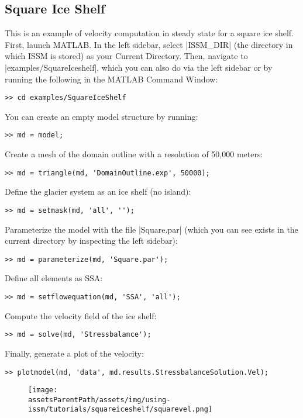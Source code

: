 
\subsection{Square Ice Shelf} \label{sec:using-issm-tutorials-squareiceshelf}
This is an example of velocity computation in steady state for a square ice shelf. First, launch MATLAB. In the left sidebar, select \lstinlinebg|ISSM_DIR| (the directory in which ISSM is stored) as your Current Directory. Then, navigate to \lstinlinebg|examples/SquareIceshelf|, which you can also do via the left sidebar or by running the following in the MATLAB Command Window:
\begin{lstlisting}
>> cd examples/SquareIceShelf
\end{lstlisting}

You can create an empty model structure by running:
\begin{lstlisting}
>> md = model;
\end{lstlisting}

Create a mesh of the domain outline with a resolution of 50,000 meters:
\begin{lstlisting}
>> md = triangle(md, 'DomainOutline.exp', 50000);
\end{lstlisting}

Define the glacier system as an ice shelf (no island):
\begin{lstlisting}
>> md = setmask(md, 'all', '');
\end{lstlisting}

Parameterize the model with the file \lstinlinebg|Square.par| (which you can see exists in the current directory by inspecting the left sidebar):
\begin{lstlisting}
>> md = parameterize(md, 'Square.par');
\end{lstlisting}

Define all elements as SSA:
\begin{lstlisting}
>> md = setflowequation(md, 'SSA', 'all');
\end{lstlisting}

Compute the velocity field of the ice shelf:
\begin{lstlisting}
>> md = solve(md, 'Stressbalance');
\end{lstlisting}

Finally, generate a plot of the velocity:
\begin{lstlisting}
>> plotmodel(md, 'data', md.results.StressbalanceSolution.Vel);
\end{lstlisting}

\begin{figure}[H]
	\begin{center}
		\texttt{[image: \\assetsParentPath/assets/img/using-issm/tutorials/squareiceshelf/squarevel.png]}
	\end{center}
\end{figure}

\clearpage %
